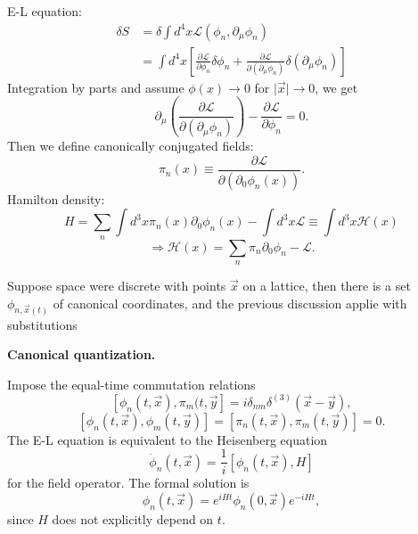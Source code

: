 \qquad E-L equation:
    \begin{align*}
        \delta S &= \delta \int d^4x \mathcal{L}(\phi_n, \partial_\mu \phi_n)\\
            &= \int d^4x[ \frac{\partial \mathcal{L}}{\partial \phi_n}\delta \phi_n + \frac{\partial \mathscr{L}}{\partial (\partial_\mu \phi_n)} \delta(\partial_\mu \phi_n)]
    \end{align*}
Integration by parts and assume $\phi(x) \to 0$ for $\vert \vec{x} \vert \to 0$, we get
        $$\partial_\mu \left( \frac{\partial \mathcal{L}}{\partial (\partial_\mu \phi_n)} \right) - \frac{\partial \mathcal{L}}{\partial \phi_n} =0.$$
Then we define canonically conjugated fields: 
        $$\pi_n(x) \equiv \frac{\partial \mathcal{L}}{\partial (\partial_0 \phi_n(x))}.$$
Hamilton density:   
        $$H= \sum\limits_n \int d^3 x \pi_n(x) \partial_0 \phi_n(x) - \int d^3 x \mathcal{L} \equiv \int d^3x \mathcal{H}(x)$$
            $$\Rightarrow \mathcal{H}(x) = \sum\limits_n \pi_n \partial_0 \phi_n - \mathcal{L}.$$

Suppose space were discrete with points $\vec{x}$ on a lattice, then there is a set $\phi_{n, \vec{x}(t)}$ of canonical coordinates, and
the previous discussion applie with substitutions

\qquad \textbf{Canonical quantization.}
    
    \qquad Impose the equal-time commutation relations
        $$[\phi_n(t, \vec{x}), \pi_m(t, \vec{y}] = i \delta_{nm} \delta^{(3)}(\vec{x}-\vec{y}),$$
        $$[\phi_n(t, \vec{x}), \phi_m(t,\vec{y})] = [\pi_n(t, \vec{x}), \pi_m(t, \vec{y})]=0.$$
The E-L equation is equivalent to the Heisenberg equation
            $$\dot{\phi}_n(t, \vec{x}) = \frac{1}{i} [ \phi_n(t, \vec{x}), H]$$
for the field operator. The formal solution is 
        $$\phi_n(t, \vec{x}) = e^{iHt} \phi_n(0, \vec{x}) e^{-iHt},$$
since $H$ does not explicitly depend on $t$.

